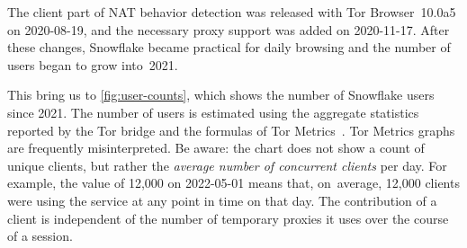 \documentclass[letterpaper,twocolumn]{article}
\begin{document}
The client part of NAT behavior detection
was released with Tor Browser~10.0a5 on \mbox{2020-08-19},
and the necessary proxy support was added on \mbox{2020-11-17}.
After these changes, Snowflake became practical for daily browsing
and the number of users began to grow into~2021.

This bring us to \autoref{fig:user-counts}, which
shows the number of Snowflake users since 2021.
The number of users is estimated using the aggregate statistics
reported by the Tor bridge
and the formulas of Tor Metrics~\cite{tor-tr-2012-10-001}.
Tor Metrics graphs are frequently misinterpreted.
Be aware: the chart does not show a count of unique clients,
but rather the \emph{average number of concurrent clients} per day.
For example, the value of 12,000 on \mbox{2022-05-01}
means that, on~average, 12,000 clients were using the service
at any point in time on that day.
The contribution of a client is independent of
the number of temporary proxies it uses
over the course of a session.
\end{document}
